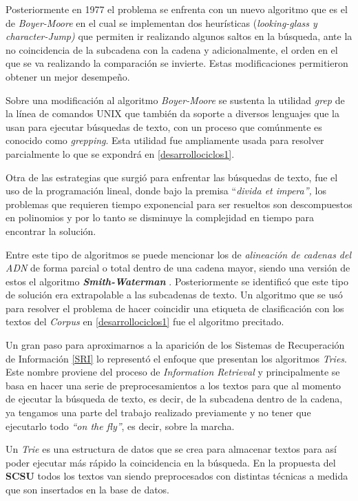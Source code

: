 \documentclass[
  12pt,
  openany]{book}
\begin{document}
Posteriormente en 1977 el problema se enfrenta con un nuevo algoritmo que es el de \emph{Boyer-Moore} en el cual se implementan dos heurísticas (\emph{looking-glass y} \emph{character-Jump)} que permiten ir realizando algunos saltos en la búsqueda, ante la no coincidencia de la subcadena con la cadena y adicionalmente, el orden en el que se va realizando la comparación se invierte. Estas modificaciones permitieron obtener un mejor desempeño.

Sobre una modificación al algoritmo \emph{Boyer-Moore} se sustenta la utilidad \emph{grep} de la línea de comandos UNIX que también da soporte a diversos lenguajes que la usan para ejecutar búsquedas de texto, con un proceso que comúnmente es conocido como \emph{grepping}. Esta utilidad fue ampliamente usada para resolver parcialmente lo que se expondrá en \ref{desarrollociclos1}.

Otra de las estrategias que surgió para enfrentar las búsquedas de texto, fue el uso de la programación lineal, donde bajo la premisa ``\emph{divida et impera'',} los problemas que requieren tiempo exponencial para ser resueltos son descompuestos en polinomios y por lo tanto se disminuye la complejidad en tiempo para encontrar la solución.

Entre este tipo de algoritmos se puede mencionar los de \emph{alineación de cadenas del ADN} de forma parcial o total dentro de una cadena mayor, siendo una versión de estos el algoritmo \textbf{\emph{Smith-Waterman}} \citep{smith1981}. Posteriormente se identificó que este tipo de solución era extrapolable a las subcadenas de texto. Un algoritmo que se usó para resolver el problema de hacer coincidir una etiqueta de clasificación con los textos del \emph{Corpus} en \ref{desarrollociclos1} fue el algoritmo precitado.

Un gran paso para aproximarnos a la aparición de los Sistemas de Recuperación de Información \ref{SRI} lo representó el enfoque que presentan los algoritmos \emph{Tries}. Este nombre proviene del proceso de \emph{Information Retrieval} y principalmente se basa en hacer una serie de preprocesamientos a los textos para que al momento de ejecutar la búsqueda de texto, es decir, de la subcadena dentro de la cadena, ya tengamos una parte del trabajo realizado previamente y no tener que ejecutarlo todo \emph{``on the fly''}, es decir, sobre la marcha.

Un \emph{Trie} \citep{fredkin1960} es una estructura de datos que se crea para almacenar textos para así poder ejecutar más rápido la coincidencia en la búsqueda. En la propuesta del \textbf{SCSU} todos los textos van siendo preprocesados con distintas técnicas a medida que son insertados en la base de datos.
\end{document}
